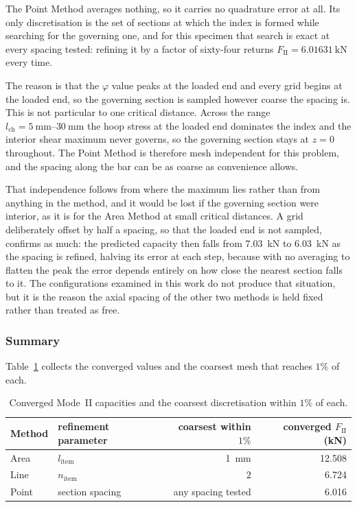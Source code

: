 The Point Method averages nothing, so it carries no quadrature error at all.
Its only discretisation is the set of sections at which the index is formed
while searching for the governing one, and for this specimen that search is
exact at every spacing tested: refining it by a factor of sixty-four returns
$F_{\mathrm{II}} = \SI{6.01631}{\kilo\newton}$ every time.
 
The reason is that the $\varphi$ value peaks at the loaded end and every grid begins at
the loaded end, so the governing section is sampled however coarse the
spacing is. This is not particular to one critical distance. Across the range
$l_{\mathrm{ch}} = \SIrange{5}{30}{\milli\metre}$ the hoop stress at the
loaded end dominates the index and the interior shear maximum never governs,
so the governing section stays at $z = 0$ throughout. The Point Method is
therefore mesh independent for this problem, and the spacing along the bar
can be as coarse as convenience allows.
 
That independence follows from where the maximum lies rather than from
anything in the method, and it would be lost if the governing section were
interior, as it is for the Area Method at small critical distances. A grid
deliberately offset by half a spacing, so that the loaded end is not sampled,
confirms as much: the predicted capacity then falls from \SI{7.03}{\kilo\newton}
to \SI{6.03}{\kilo\newton} as the spacing is refined, halving its error at
each step, because with no averaging to flatten the peak the error depends
entirely on how close the nearest section falls to it. The configurations
examined in this work do not produce that situation, but it is the reason the
axial spacing of the other two methods is held fixed rather than treated as
free.
 
\subsubsection*{Summary}
 
Table~\ref{tab:sensconv} collects the converged values and the coarsest mesh
that reaches $1\%$ of each.
 
\begin{table}[htbp]
\centering
\caption{Converged Mode~II capacities and the coarsest discretisation within
         $1\%$ of each.}
\label{tab:sensconv}
\begin{tabular}{llrr}
\toprule
Method & refinement parameter & coarsest within $1\%$
       & converged $F_{\mathrm{II}}$ (\si{\kilo\newton}) \\
\midrule
Area  & $l_{\mathrm{item}}$    & \SI{1}{\milli\metre}   & 12.508 \\
Line  & $n_{\mathrm{item}}$    & $2$                    &  6.724 \\
Point & section spacing        & any spacing tested     &  6.016 \\
\bottomrule
\end{tabular}
\end{table}
 
